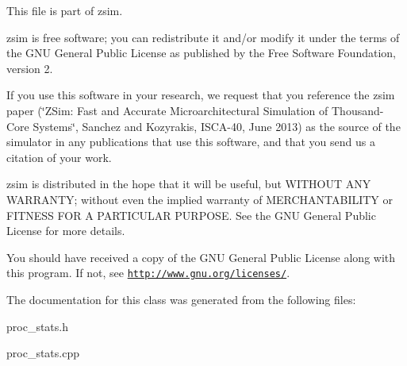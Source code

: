 This file is part of zsim.

zsim is free software; you can redistribute it and/or modify it under the terms of the G\-N\-U General Public License as published by the Free Software Foundation, version 2.

If you use this software in your research, we request that you reference the zsim paper (\char`\"{}\-Z\-Sim\-: Fast and Accurate Microarchitectural Simulation of
\-Thousand-\/\-Core Systems\char`\"{}, Sanchez and Kozyrakis, I\-S\-C\-A-\/40, June 2013) as the source of the simulator in any publications that use this software, and that you send us a citation of your work.

zsim is distributed in the hope that it will be useful, but W\-I\-T\-H\-O\-U\-T A\-N\-Y W\-A\-R\-R\-A\-N\-T\-Y; without even the implied warranty of M\-E\-R\-C\-H\-A\-N\-T\-A\-B\-I\-L\-I\-T\-Y or F\-I\-T\-N\-E\-S\-S F\-O\-R A P\-A\-R\-T\-I\-C\-U\-L\-A\-R P\-U\-R\-P\-O\-S\-E. See the G\-N\-U General Public License for more details.

You should have received a copy of the G\-N\-U General Public License along with this program. If not, see \href{http://www.gnu.org/licenses/}{\tt http\-://www.\-gnu.\-org/licenses/}. 

The documentation for this class was generated from the following files\-:\begin{DoxyCompactItemize}
\item 
proc\-\_\-stats.\-h\item 
proc\-\_\-stats.\-cpp\end{DoxyCompactItemize}
